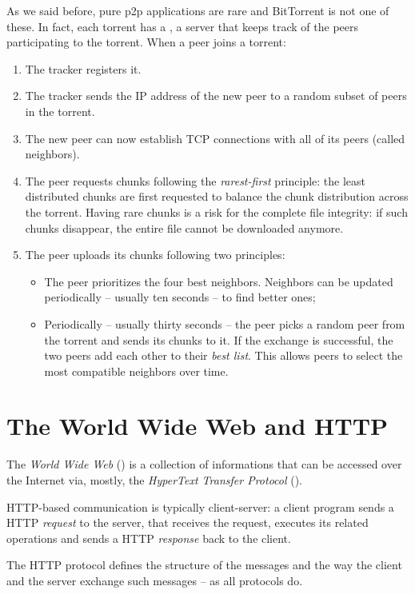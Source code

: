 As we said before, pure p2p applications are rare and BitTorrent is not one of these.
In fact, each torrent has a , a server that keeps track of the peers participating to the torrent. 
When a peer joins a torrent:
\begin{enumerate}
    \item The tracker registers it.
    \item The tracker sends the IP address of the new peer to a random subset of peers in the torrent.
    \item The new peer can now establish TCP connections with all of its peers (called neighbors).
    \item The peer requests chunks following the \emph{rarest-first} principle: the least distributed chunks are first requested to balance the chunk distribution across the torrent. Having rare chunks is a risk for the complete file integrity: if such chunks disappear, the entire file cannot be downloaded anymore.
    \item The peer uploads its chunks following two principles:
        \begin{itemize}
            \item The peer prioritizes the four best neighbors. Neighbors can be updated periodically -- usually ten seconds -- to find better ones;
            \item Periodically -- usually thirty seconds -- the peer picks a random peer from the torrent and sends its chunks to it. If the exchange is successful, the two peers add each other to their \emph{best list}. This allows peers to select the most compatible neighbors over time.
        \end{itemize}
\end{enumerate}

\section{The World Wide Web and HTTP}
The \emph{World Wide Web} () is a collection of informations that can be accessed over the Internet via, mostly, the \emph{HyperText Transfer Protocol} ().

HTTP-based communication is typically client-server: a client program sends a HTTP \emph{request} to the server, that receives the request, executes its related operations and sends a HTTP \emph{response} back to the client.

The HTTP protocol defines the structure of the messages and the way the client and the server exchange such messages -- as all protocols do.

